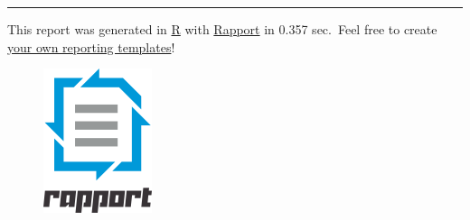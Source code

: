 \documentclass[]{article}
\makeatletter
\def\maxwidth{\ifdim\Gin@nat@width>\linewidth\linewidth
\else\Gin@nat@width\fi}
\let\Oldincludegraphics\includegraphics
\renewcommand{\includegraphics}[1]{\Oldincludegraphics[width=\maxwidth]{#1}}
\makeatother
\begin{document}
\begin{center}\rule{3in}{0.4pt}\end{center}

This report was generated in \href{http://www.r-project.org/}{R} with
\href{http://al3xa.github.com/rapport/}{Rapport} in 0.357 sec.~Feel free
to create \href{http://al3xa.github.com/rapport/#custom}{your own
reporting templates}!

\begin{figure}[htbp]
\centering
\includegraphics{images/rapport.png}
\caption{}
\end{figure}
\end{document}
